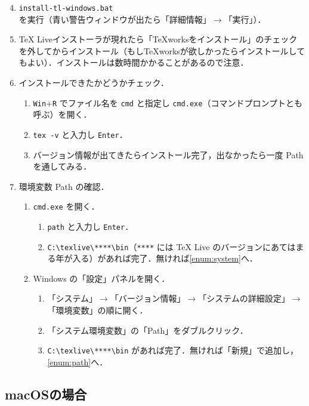 \begin{enumerate}
    \setcounter{enumi}{3}
    \item \verb|install-tl-windows.bat| を実行（青い警告ウィンドウが出たら「詳細情報」$\to$「実行」）．\label{enum:bat}
    \item TeX Liveインストーラが現れたら「TeXworksをインストール」のチェックを外してからインストール（もしTeXworksが欲しかったらインストールしてもよい）．インストールは数時間かかることがあるので注意．
    \item インストールできたかどうかチェック．
    \begin{enumerate}
        \item \verb|Win|$+$\verb|R| でファイル名を \verb|cmd| と指定し \verb|cmd.exe|（コマンドプロンプトとも呼ぶ）を開く．
        \item \verb|tex -v| と入力し \verb|Enter|．
        \item バージョン情報が出てきたらインストール完了，出なかったら一度 Path を通してみる．
    \end{enumerate}
    \item 環境変数 Path の確認．
    \begin{enumerate}
        \item \verb|cmd.exe| を開く．\label{enum:path}
        \begin{enumerate}
            \item \verb|path| と入力し \verb|Enter|．
            \item \verb|C:\texlive\****\bin|（\verb|****| には TeX Live のバージョンにあてはまる年が入る）があれば完了．無ければ\ref{enum:system}へ．
        \end{enumerate}
        \item Windows の「設定」パネルを開く．\label{enum:system}
        \begin{enumerate}
            \item 「システム」$\to$「バージョン情報」$\to$「システムの詳細設定」$\to$「環境変数」の順に開く．
            \item 「システム環境変数」の「Path」をダブルクリック．
            \item \verb|C:\texlive\****\bin| があれば完了．無ければ「新規」で追加し，\ref{enum:path}へ．
        \end{enumerate}
    \end{enumerate}
\end{enumerate}

\subsection{macOSの場合}
\label{ssec:mac}



